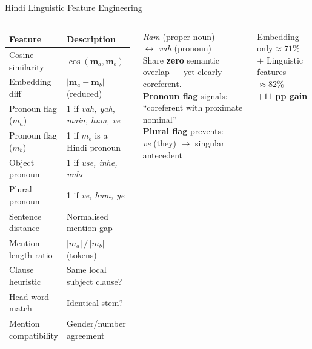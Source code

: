 \documentclass[aspectratio=169]{beamer}
\begin{document}
\begin{frame}{Hindi Linguistic Feature Engineering}
  \begin{columns}[T]
      \begin{tcolorbox}[nbox={Feature Vector for Mention Pair $(m_a,\,m_b)$}]
        \small
        \renewcommand{\arraystretch}{1.35}
        \begin{tabular}{p{3.0cm} p{4.0cm}}
          \toprule
          \textbf{Feature} & \textbf{Description}\\
          \midrule
          Cosine similarity & $\cos(\mathbf{m}_a,\mathbf{m}_b)$\\
          Embedding diff & $|\mathbf{m}_a - \mathbf{m}_b|$ (reduced)\\
          Pronoun flag ($m_a$) & 1 if \textit{vah, yah, main, hum, ve}\\
          Pronoun flag ($m_b$) & 1 if $m_b$ is a Hindi pronoun\\
          Object pronoun & 1 if \textit{use, inhe, unhe}\\
          Plural pronoun & 1 if \textit{ve, hum, ye}\\
          Sentence distance & Normalised mention gap\\
          Mention length ratio & $|m_a|\,/\,|m_b|$ (tokens)\\
          Clause heuristic & Same local subject clause?\\
          Head word match & Identical stem?\\
          Mention compatibility & Gender/number agreement\\
          \bottomrule
        \end{tabular}
      \end{tcolorbox}

      \begin{tcolorbox}[wbox={Why Not Embeddings Alone?}]
        \small
        \textit{Ram} (proper noun)\\
        $\leftrightarrow$ \textit{vah} (pronoun)\\[3pt]
        Share \textcolor{red!70!black}{\textbf{zero}} semantic overlap
        — yet clearly coreferent.\\[6pt]
        \textbf{Pronoun flag} signals:\\
        ``coreferent with proximate nominal''\\[4pt]
        \textbf{Plural flag} prevents:\\
        \textit{ve} (they) $\to$ singular antecedent
      \end{tcolorbox}

      \vspace{6pt}
      \begin{tcolorbox}[rbox={Ablation Preview}]
        \small
        Embedding only\hfill ${\approx}71\%$\\
        $+$ Linguistic features\hfill \textbf{${\approx}82\%$}\\[4pt]
        \centering
        \textcolor{accentgreen}{\large\textbf{$+11$ pp gain}}
      \end{tcolorbox}
  \end{columns}
\end{frame}
\end{document}

